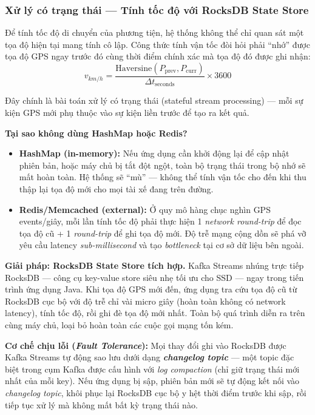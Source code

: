 \subsubsection{Xử lý có trạng thái — Tính tốc độ với RocksDB State Store}
\label{sec:stateful-processing}

Để tính tốc độ di chuyển của phương tiện, hệ thống không thể chỉ quan sát một tọa độ hiện tại mang tính cô lập. Công thức tính vận tốc đòi hỏi phải ``nhớ'' được tọa độ GPS ngay trước đó cùng thời điểm chính xác mà tọa độ đó được ghi nhận:
$$v_{km/h} = \frac{\text{Haversine}(P_{\text{prev}}, P_{\text{curr}})}{\Delta t_{\text{seconds}}} \times 3600$$

Đây chính là bài toán xử lý có trạng thái (stateful stream processing) — mỗi sự kiện GPS mới phụ thuộc vào sự kiện liền trước để tạo ra kết quả.

\bigskip
\noindent
\textbf{Tại sao không dùng HashMap hoặc Redis?}
\begin{itemize}
    \item \textbf{HashMap (in-memory):} Nếu ứng dụng cần khởi động lại để cập nhật phiên bản, hoặc máy chủ bị tắt đột ngột, toàn bộ trạng thái trong bộ nhớ sẽ mất hoàn toàn. Hệ thống sẽ ``mù'' — không thể tính vận tốc cho đến khi thu thập lại tọa độ mới cho mọi tài xế đang trên đường.
    \item \textbf{Redis/Memcached (external):} Ở quy mô hàng chục nghìn GPS events/giây, mỗi lần tính tốc độ phải thực hiện 1 \textit{network round-trip} để đọc tọa độ cũ + 1 \textit{round-trip} để ghi tọa độ mới. Độ trễ mạng cộng dồn sẽ phá vỡ yêu cầu latency \textit{sub-millisecond} và tạo \textit{bottleneck} tại cơ sở dữ liệu bên ngoài.
\end{itemize}

\noindent
\textbf{Giải pháp: RocksDB State Store tích hợp.} Kafka Streams nhúng trực tiếp RocksDB — công cụ key-value store siêu nhẹ tối ưu cho SSD — ngay trong tiến trình ứng dụng Java. Khi tọa độ GPS mới đến, ứng dụng tra cứu tọa độ cũ từ RocksDB cục bộ với độ trễ chỉ vài micro giây (hoàn toàn không có network latency), tính tốc độ, rồi ghi đè tọa độ mới nhất. Toàn bộ quá trình diễn ra trên cùng máy chủ, loại bỏ hoàn toàn các cuộc gọi mạng tốn kém.

\bigskip
\noindent
\textbf{Cơ chế chịu lỗi (\textit{Fault Tolerance}):} Mọi thay đổi ghi vào RocksDB được Kafka Streams tự động sao lưu dưới dạng \textbf{\textit{changelog topic}} — một topic đặc biệt trong cụm Kafka được cấu hình với \textit{log compaction} (chỉ giữ trạng thái mới nhất của mỗi key). Nếu ứng dụng bị sập, phiên bản mới sẽ tự động kết nối vào \textit{changelog topic}, khôi phục lại RocksDB cục bộ y hệt thời điểm trước khi sập, rồi tiếp tục xử lý mà không mất bất kỳ trạng thái nào.

